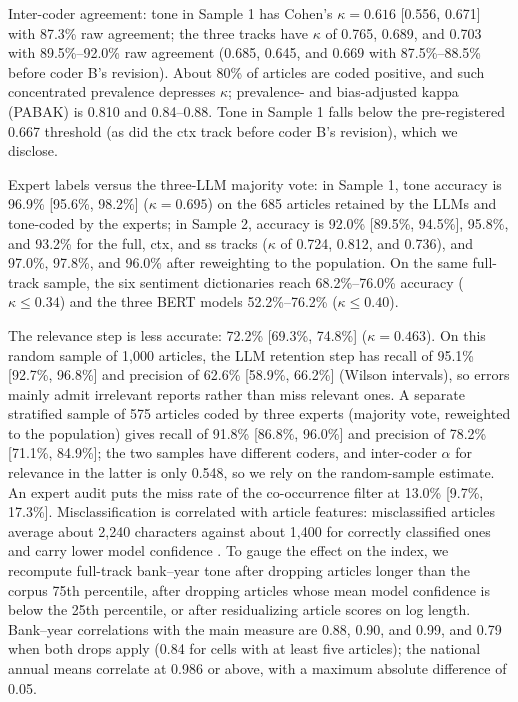 Inter-coder agreement: tone in Sample 1 has Cohen's $\kappa = 0.616$
[0.556, 0.671] with 87.3\% raw agreement; the three tracks have
$\kappa$ of 0.765, 0.689, and 0.703 with 89.5\%--92.0\% raw agreement
(0.685, 0.645, and 0.669 with 87.5\%--88.5\% before coder B's revision).
About 80\% of articles are coded positive, and such concentrated
prevalence depresses $\kappa$; prevalence- and bias-adjusted kappa (PABAK)
is 0.810 and 0.84--0.88. Tone in Sample 1 falls below the pre-registered
0.667 threshold (as did the ctx track before coder B's revision), which we
disclose.

Expert labels versus the three-LLM majority vote: in Sample 1, tone
accuracy is 96.9\% [95.6\%, 98.2\%] ($\kappa = 0.695$) on the 685 articles
retained by the LLMs and tone-coded by the experts; in Sample 2, accuracy
is 92.0\% [89.5\%, 94.5\%], 95.8\%, and 93.2\% for the full, ctx, and ss
tracks ($\kappa$ of 0.724, 0.812, and 0.736), and 97.0\%, 97.8\%, and
96.0\% after reweighting to the population. On the same full-track sample,
the six sentiment dictionaries reach 68.2\%--76.0\% accuracy
($\kappa \le 0.34$) and the three BERT models 52.2\%--76.2\%
($\kappa \le 0.40$).

The relevance step is less accurate: 72.2\% [69.3\%, 74.8\%]
($\kappa = 0.463$). On this random sample of 1{,}000 articles, the LLM
retention step has recall of 95.1\% [92.7\%, 96.8\%] and precision of
62.6\% [58.9\%, 66.2\%] (Wilson intervals), so errors mainly admit
irrelevant reports rather than miss relevant ones. A separate stratified
sample of 575 articles coded by three experts (majority vote, reweighted to
the population) gives recall of 91.8\% [86.8\%, 96.0\%] and precision of
78.2\% [71.1\%, 84.9\%]; the two samples have different coders, and
inter-coder $\alpha$ for relevance in the latter is only 0.548, so we rely
on the random-sample estimate. An expert audit puts the miss rate of the
co-occurrence filter at 13.0\% [9.7\%, 17.3\%]. Misclassification is
correlated with article features: misclassified articles average about
2{,}240 characters against about 1{,}400 for correctly classified ones and
carry lower model confidence \parencite{carlson2026llmannotation}. To gauge
the effect on the index, we recompute full-track bank--year tone after dropping
articles longer than the corpus 75th percentile, after dropping articles
whose mean model confidence is below the 25th percentile, or after
residualizing article scores on log length. Bank--year correlations with
the main measure are 0.88, 0.90, and 0.99, and 0.79 when both drops apply
(0.84 for cells with at least five articles); the national annual means
correlate at 0.986 or above, with a maximum absolute difference of 0.05.


